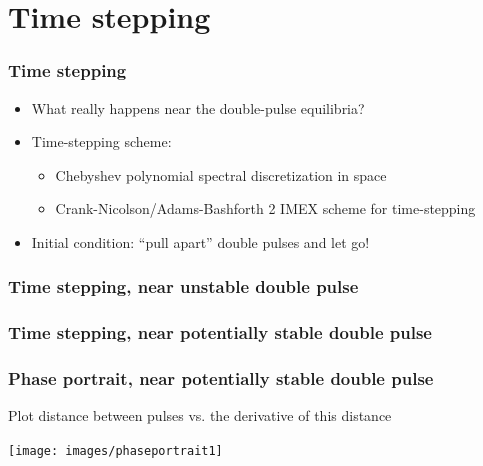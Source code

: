 \documentclass[16pt]{beamer}
\begin{document}
\section{Time stepping}

\begin{frame}
	\frametitle{Time stepping}
	\fontsize{16}{7.2}\selectfont
	\begin{itemize}
		\item<1->What really happens near the double-pulse equilibria?
		\item<2->Time-stepping scheme:
		\begin{itemize}
			\item Chebyshev polynomial spectral discretization in space
			\item Crank-Nicolson/Adams-Bashforth 2 IMEX scheme for time-stepping
		\end{itemize}
		\item<3->Initial condition: ``pull apart'' double pulses and let go!
	\end{itemize}
\end{frame}

\begin{frame}
	\frametitle{Time stepping, near unstable double pulse}
	\fontsize{16}{7.2}\selectfont
	\begin{center}
	\end{center}
\end{frame}

\begin{frame}
	\frametitle{Time stepping, near potentially stable double pulse}
	\fontsize{16}{7.2}\selectfont
	\begin{center}
	\end{center}
\end{frame}

\begin{frame}
	\frametitle{Phase portrait, near potentially stable double pulse}
	\fontsize{16}{7.2}\selectfont
	Plot distance between pulses vs. the derivative of this distance
	\begin{center}
	\texttt{[image: images/phaseportrait1]}
	\end{center}
\end{frame}
\end{document}
